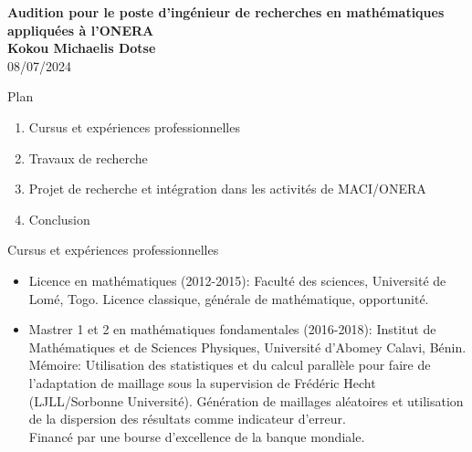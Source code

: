 \documentclass[compress,10pt,aspectratio=169]{beamer}
\date[]{}
\begin{document}




\begin{frame}[plain]
\centering
\Large
\textbf{\color{onera}Audition pour le poste d'ingénieur de recherches en mathématiques appliquées à l'ONERA}\\
\vspace{1cm}
\textbf{\color{onera_gray}Kokou Michaelis Dotse}\\
\vspace{1cm}
\normalsize
08/07/2024
\end{frame}


\begin{frame}{Plan}
\vspace{-0.4cm}
\begin{enumerate}
    \item \color{onera} Cursus et expériences professionnelles\\\vspace{0.5cm}
    \item Travaux de recherche \\\vspace{0.5cm}
    \item Projet de recherche et intégration dans les activités de MACI/ONERA\\\vspace{0.5cm}
    \item Conclusion
\end{enumerate}
\end{frame}



\begin{frame}{Cursus et expériences professionnelles}
\small
\begin{itemize}
\item {\color{onera} Licence en mathématiques (2012-2015):} Faculté des sciences, Université de Lomé, Togo. {\color{onera_gray} Licence classique, générale de mathématique, opportunité.}\\\vspace{0.8cm}

\item {\color{onera} Mastrer 1 et 2 en mathématiques fondamentales (2016-2018):} Institut de Mathématiques et de Sciences Physiques, Université d'Abomey Calavi, Bénin.\\
Mémoire: Utilisation des statistiques et du calcul parallèle pour faire de l’adaptation de maillage sous la supervision de Frédéric Hecht (LJLL/Sorbonne Université). {\color{onera_gray} Génération de maillages aléatoires et utilisation de la dispersion des résultats comme indicateur d'erreur.}\\
Financé par une bourse d'excellence de la banque mondiale.\\
\vspace{0.3cm}
\end{itemize}
\end{frame}
\end{document}
